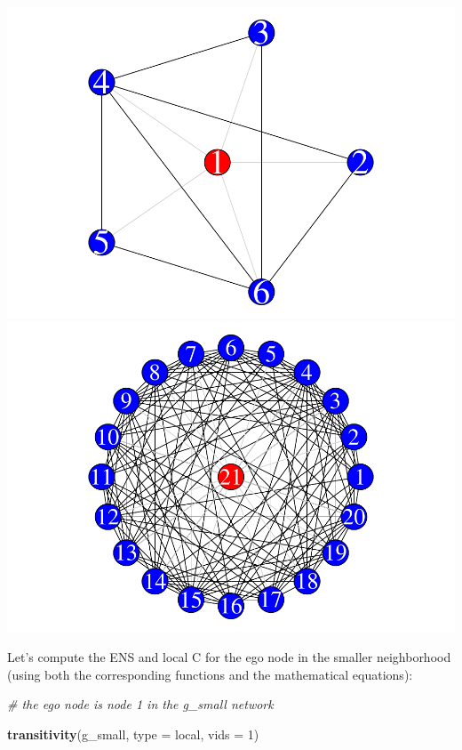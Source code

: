 \documentclass[
]{book}
\newenvironment{Shaded}{\begin{snugshade}}{\end{snugshade}}
\newcommand{\AttributeTok}[1]{\textcolor[rgb]{0.13,0.29,0.53}{#1}}
\newcommand{\CommentTok}[1]{\textcolor[rgb]{0.56,0.35,0.01}{\textit{#1}}}
\newcommand{\DecValTok}[1]{\textcolor[rgb]{0.00,0.00,0.81}{#1}}
\newcommand{\FunctionTok}[1]{\textcolor[rgb]{0.13,0.29,0.53}{\textbf{#1}}}
\newcommand{\NormalTok}[1]{#1}
\newcommand{\StringTok}[1]{\textcolor[rgb]{0.31,0.60,0.02}{#1}}
\begin{document}
\includegraphics{bookdown-demo_files/figure-latex/unnamed-chunk-165-1.pdf} \includegraphics{bookdown-demo_files/figure-latex/unnamed-chunk-165-2.pdf}

Let's compute the ENS and local C for the ego node in the smaller neighborhood (using both the corresponding functions and the mathematical equations):

\begin{Shaded}
\begin{Highlighting}[]
\CommentTok{\# the ego node is node 1 in the g\_small network }

\FunctionTok{transitivity}\NormalTok{(g\_small, }\AttributeTok{type =} \StringTok{\textquotesingle{}local\textquotesingle{}}\NormalTok{, }\AttributeTok{vids =} \DecValTok{1}\NormalTok{)}
\end{Highlighting}
\end{Shaded}
\end{document}

